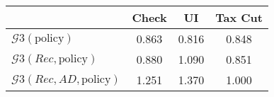 \begin{tabular}{@{}lccc@{}} 
\toprule 
                          & Check      & UI    & Tax Cut    \\  \midrule 
$\mathcal{G}3(\text{policy})$ & 0.863  & 0.816  & 0.848     \\ 
$\mathcal{G}3(Rec,\text{policy})$ & 0.880  & 1.090  & 0.851     \\ 
$\mathcal{G}3(Rec, AD,\text{policy})$ & 1.251  & 1.370  & 1.000     \\ 
\end{tabular}  
